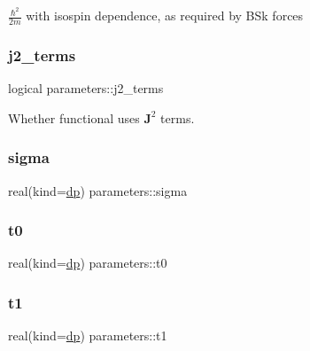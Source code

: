 $\frac{\hbar^2}{2m}$ with isospin dependence, as required by B\+Sk forces 

\mbox{\label{group__SKYRME__PARS_ga8d1441b6c74260a2058e73213ae60941}} 
\subsubsection{\texorpdfstring{j2\+\_\+terms}{j2\_terms}}
{\footnotesize\ttfamily logical parameters\+::j2\+\_\+terms}



Whether functional uses $\textbf{J}^2$ terms. 

\mbox{\label{group__SKYRME__PARS_ga3726a27918a1e2929cdac9ffd451ec14}} 
\subsubsection{\texorpdfstring{sigma}{sigma}}
{\footnotesize\ttfamily real(kind=\mbox{\hyperlink{namespaceparameters_a52f8c6351fd79345d8811e065bcbbb37}{dp}}) parameters\+::sigma}

\mbox{\label{group__SKYRME__PARS_gadbebfa135603ae9f34b4a98ac62ce8d8}} 
\subsubsection{\texorpdfstring{t0}{t0}}
{\footnotesize\ttfamily real(kind=\mbox{\hyperlink{namespaceparameters_a52f8c6351fd79345d8811e065bcbbb37}{dp}}) parameters\+::t0}

\mbox{\label{group__SKYRME__PARS_ga2104f8e3f4c55a866272683975f6acd0}} 
\subsubsection{\texorpdfstring{t1}{t1}}
{\footnotesize\ttfamily real(kind=\mbox{\hyperlink{namespaceparameters_a52f8c6351fd79345d8811e065bcbbb37}{dp}}) parameters\+::t1}

